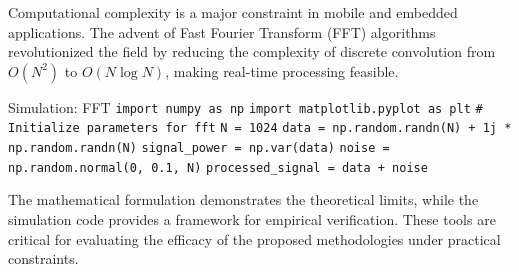 Computational complexity is a major constraint in mobile and embedded applications. The advent of Fast Fourier Transform (FFT) algorithms revolutionized the field by reducing the complexity of discrete convolution from $O(N^2)$ to $O(N \log N)$, making real-time processing feasible.

\begin{pythonbox}{Simulation: FFT}
\texttt{import numpy as np}
\texttt{import matplotlib.pyplot as plt}
\texttt{}
\texttt{\# Initialize parameters for fft}
\texttt{N = 1024}
\texttt{data = np.random.randn(N) + 1j * np.random.randn(N)}
\texttt{signal\_power = np.var(data)}
\texttt{noise = np.random.normal(0, 0.1, N)}
\texttt{processed\_signal = data + noise}
\end{pythonbox}

\vspace{0.5cm}
The mathematical formulation demonstrates the theoretical limits, while the simulation code provides a framework for empirical verification. These tools are critical for evaluating the efficacy of the proposed methodologies under practical constraints.

